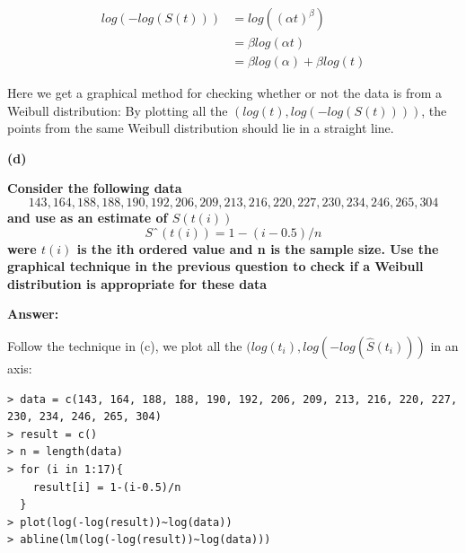 \documentclass[letterpaper,11pt]{article}
\begin{document}
\begin{align}
log(-log(S(t))) & = log((\alpha t)^{\beta})\nonumber\\
& = \beta log(\alpha t) \nonumber\\
& = \beta log(\alpha) + \beta log(t) \nonumber
\end{align}

Here we get a graphical method for checking whether or not the data is from a Weibull distribution: By plotting all the $(log(t), log(-log(S(t))))$, the points from the same Weibull distribution should lie in a straight line.


\begin{addmargin}[-1.1em]{0em}
  \textbf{(d)}\par
\end{addmargin}
\textbf{Consider the following data}
$$143, 164, 188, 188, 190, 192, 206, 209, 213, 216, 220, 227, 230, 234, 246, 265, 304$$
\textbf{and use as an estimate of $S(t(i))$}
$$Sˆ(t(i)) = 1 − (i - 0.5)/n$$
\textbf{were $t(i)$ is the ith ordered value and n is the sample size. Use the graphical technique
in the previous question to check if a Weibull distribution is appropriate for these data}\par
\bigbreak
\begin{addmargin}[-0.5em]{0em}
  \textbf{Answer: }
\end{addmargin}

Follow the technique in (c), we plot all the $(log(t_i), log(-log(\hat{S}(t_i)))$ in an axis:
\begin{lstlisting}
> data = c(143, 164, 188, 188, 190, 192, 206, 209, 213, 216, 220, 227, 230, 234, 246, 265, 304)
> result = c()
> n = length(data)
> for (i in 1:17){
    result[i] = 1-(i-0.5)/n
  }
> plot(log(-log(result))~log(data))
> abline(lm(log(-log(result))~log(data)))
\end{lstlisting}
\end{document}
